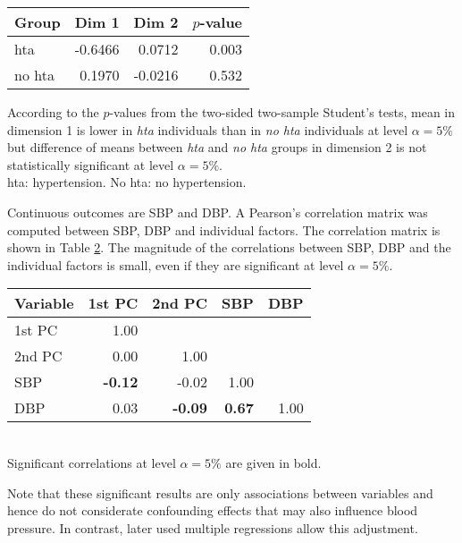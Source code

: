 \begin{table}
\centering
{}
\begin{tabular}{lrrr}
\toprule
Group & Dim 1 & Dim 2 & $p$-value \\
\midrule
hta & -0.6466 & 0.0712 & 0.003 \\
no hta & 0.1970 &  -0.0216 & 0.532 \\
\bottomrule
\end{tabular}
\label{table:ttestout}
\begin{flushleft}
{\footnotesize According to the $p$-values from the two-sided two-sample Student’s tests, mean in dimension 1 is lower in \emph{hta} individuals than in \emph{no hta} individuals at level $\alpha=5\%$ but difference of means between \emph{hta} and \emph{no hta} groups in dimension 2 is not statistically significant at level $\alpha=5\%$. \\
hta: hypertension. No hta: no hypertension.}
\end{flushleft}
\end{table}

Continuous outcomes are SBP and DBP. A Pearson's correlation matrix was computed between SBP, DBP and individual factors. The correlation matrix is shown in Table \ref{table:cortoprint}. The magnitude of the correlations between SBP, DBP and the individual factors is small, even if they are significant at level $\alpha=5\%$.

\begin{table}
\centering
{}
\begin{tabular}{l|rrrr}
\toprule
Variable & 1st PC & 2nd PC & SBP & DBP \\
\midrule
1st PC & 1.00 &  & &   \\
2nd PC & 0.00 & 1.00 &  & \\
SBP  &\textbf{-0.12} &-0.02&  1.00 &  \\
DBP  & 0.03& \textbf{-0.09} & \textbf{0.67} & 1.00 \\
\bottomrule
\end{tabular}
\label{table:cortoprint} \\
{\footnotesize Significant correlations at level $\alpha=5\%$ are given in bold.}
\end{table}

Note that these significant results are only associations between variables and hence do not considerate confounding effects that may also influence blood pressure. In contrast, later used multiple regressions allow this adjustment.
 
